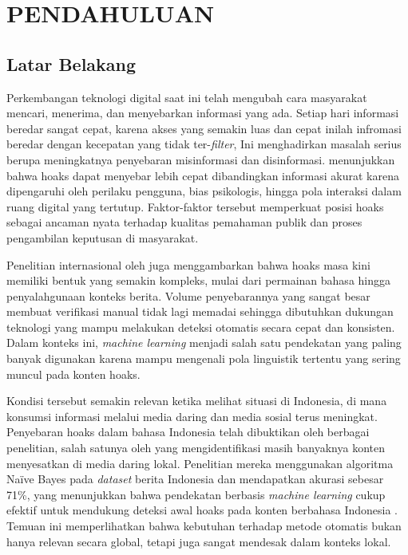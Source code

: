 \chapter{PENDAHULUAN}
\label{chap:pendahuluan}
\section{Latar Belakang}

Perkembangan teknologi digital saat ini telah mengubah cara masyarakat mencari, menerima, dan menyebarkan informasi yang ada. Setiap hari informasi beredar sangat cepat, karena akses yang semakin luas dan cepat inilah infromasi beredar dengan kecepatan yang tidak ter-\textit{filter}, Ini menghadirkan masalah serius berupa meningkatnya penyebaran misinformasi dan disinformasi. \textcite{alghamdi2024comprehensive} menunjukkan bahwa hoaks dapat menyebar lebih cepat dibandingkan informasi akurat karena dipengaruhi oleh perilaku pengguna, bias psikologis, hingga pola interaksi dalam ruang digital yang tertutup. Faktor-faktor tersebut memperkuat posisi hoaks sebagai ancaman nyata terhadap kualitas pemahaman publik dan proses pengambilan keputusan di masyarakat.

Penelitian internasional oleh \textcite{emilremus2025} juga menggambarkan bahwa hoaks masa kini memiliki bentuk yang semakin kompleks, mulai dari permainan bahasa hingga penyalahgunaan konteks berita. Volume penyebarannya yang sangat besar membuat verifikasi manual tidak lagi memadai sehingga dibutuhkan dukungan teknologi yang mampu melakukan deteksi otomatis secara cepat dan konsisten. Dalam konteks ini, \textit{machine learning} menjadi salah satu pendekatan yang paling banyak digunakan karena mampu mengenali pola linguistik tertentu yang sering muncul pada konten hoaks.

Kondisi tersebut semakin relevan ketika melihat situasi di Indonesia, di mana konsumsi informasi melalui media daring dan media sosial terus meningkat. Penyebaran hoaks dalam bahasa Indonesia telah dibuktikan oleh berbagai penelitian, salah satunya oleh \textcite{pratiwi2022hoax} yang mengidentifikasi masih banyaknya konten menyesatkan di media daring lokal. Penelitian mereka menggunakan algoritma Na\"{i}ve Bayes pada \textit{dataset} berita Indonesia dan mendapatkan akurasi sebesar 71\%, yang menunjukkan bahwa pendekatan berbasis \textit{machine learning} cukup efektif untuk mendukung deteksi awal hoaks pada konten berbahasa Indonesia \autocite{pratiwi2022hoax}. Temuan ini memperlihatkan bahwa kebutuhan terhadap metode otomatis bukan hanya relevan secara global, tetapi juga sangat mendesak dalam konteks lokal.

